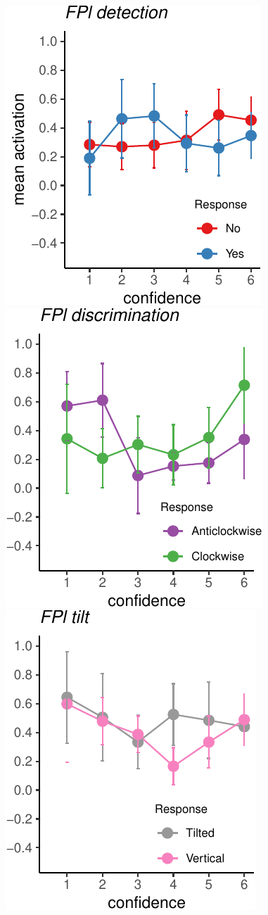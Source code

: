 \documentclass[]{article}
\begin{document}
\includegraphics{Chudi-Thesis_files/figure-latex/unnamed-chunk-10-1.pdf}
\includegraphics{Chudi-Thesis_files/figure-latex/unnamed-chunk-10-2.pdf}
\includegraphics{Chudi-Thesis_files/figure-latex/unnamed-chunk-10-3.pdf}
~
\end{document}
